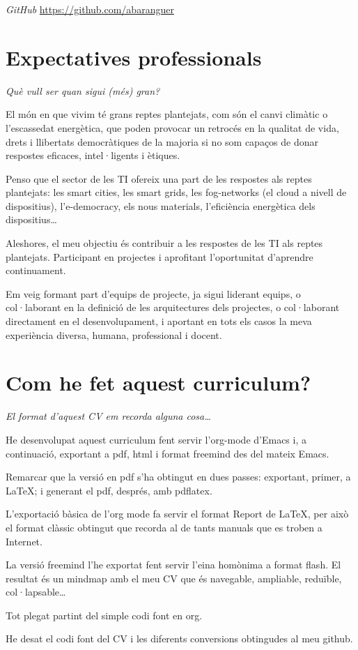 \documentclass[11pt]{article}
\begin{document}
\emph{GitHub} \href{https://github.com/abaranguer}{https://github.com/abaranguer}
\section{Expectatives professionals}
\label{sec-9}

\emph{Què vull ser quan sigui (més) gran?}

El món en que vivim té grans reptes plantejats, com són el canvi climàtic o l'escassedat energètica, que poden provocar un retrocés en la qualitat de vida, drets i llibertats democràtiques de la majoria si no som capaços de donar respostes eficaces, intel·ligents i ètiques. 

Penso que el sector de les TI ofereix una part de les respostes als reptes plantejats: les smart cities, les smart grids, les fog-networks (el cloud a nivell de dispositius), l'e-democracy, els nous materials, l'eficiència energètica dels dispositius\ldots{} 

Aleshores, el meu objectiu és contribuir a les respostes de les TI als reptes plantejats. Participant en projectes i aprofitant l'oportunitat d'aprendre continuament. 

Em veig formant part d'equips de projecte, ja sigui liderant equips, o col·laborant en la definició de les arquitectures dels projectes, o col·laborant directament en el desenvolupament, i aportant en tots els casos la meva experiència diversa, humana, professional i docent.
\section{Com he fet aquest curriculum?}
\label{sec-10}

\emph{El format d'aquest CV em recorda alguna cosa\ldots{}}

He desenvolupat aquest curriculum fent servir l'org-mode d'Emacs i, a continuació, exportant a pdf, html i format freemind des del mateix Emacs.

Remarcar que la versió en pdf s'ha obtingut en dues passes: exportant, primer, a \LaTeX{}; i generant el pdf, després, amb pdflatex. 

L'exportació bàsica de l'org mode fa servir el format Report de \LaTeX{}, per això el format clàssic obtingut que recorda al de tants manuals que es troben a Internet. 

La versió freemind l'he exportat fent servir l'eina homònima a format flash. El resultat és un mindmap amb el meu CV que és navegable, ampliable, reduïble, col·lapsable\ldots{}

Tot plegat partint del simple codi font en org.

He desat el codi font del CV i les diferents conversions obtingudes al meu github.
\end{document}

